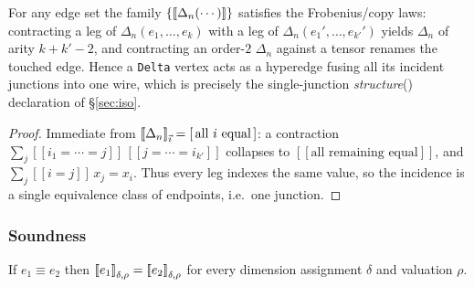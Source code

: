 \documentclass[sigplan,10pt,review]{acmart}
\begin{document}
\begin{lemma}\label{lem:delta}
For any edge set the family $\{\left[\!\left[\Delta_n(\cdots)\right]\!\right]\}$ satisfies the
Frobenius/copy laws: contracting a leg of $\Delta_n(e_1,\dots,e_k)$ with a
leg of $\Delta_n(e_1',\dots,e_{k'}')$ yields $\Delta_n$ of arity
$k+k'-2$, and contracting an order-$2$ $\Delta_n$ against a tensor
renames the touched edge. Hence a \texttt{Delta} vertex acts as a
hyperedge fusing all its incident junctions into one wire, which is
precisely the single-junction \textit{structure}() declaration of
\S\ref{sec:iso}.
\end{lemma}

\begin{proof}
Immediate from $\left[\!\left[\Delta_n\right]\!\right]_{\vec\imath}=[\,\text{all }i\text{ equal}\,]$:
a contraction $\sum_j [\![i_1{=}\cdots{=}j]\!]\,[\![j{=}\cdots{=}i_{k'}]\!]$
collapses to $[\![\text{all remaining equal}]\!]$, and
$\sum_j[\![i{=}j]\!]\,x_{j}=x_i$. Thus every leg indexes the same value,
so the incidence is a single equivalence class of endpoints, i.e.\ one
junction.
\end{proof}

\subsubsection*{Soundness}

\begin{theorem}\label{thm:sound}
If $e_1\equiv e_2$ then $\left[\!\left[e_1\right]\!\right]_{\delta,\rho}=\left[\!\left[e_2\right]\!\right]_{\delta,\rho}$
for every dimension assignment $\delta$ and valuation $\rho$.
\end{theorem}
\end{document}
